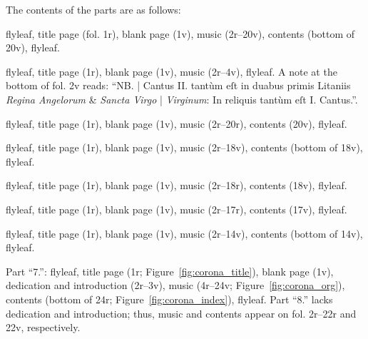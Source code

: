 \documentclass[abbrwidth=7em,shorttitlesize=55]{ees}
\begin{document}
The contents of the parts are as follows:

\begin{description}[labelwidth=1.5em,leftmargin=2em]
  \item[S 1] flyleaf, title page (fol. 1r), blank page (1v), music (2r–20v), contents (bottom of 20v), flyleaf.
  \item[S 2] flyleaf, title page (1r), blank page (1v), music (2r–4v), flyleaf. A note at the bottom of fol. 2v reads: “NB. | Cantus II. tantùm eſt in duabus primis Litaniis \textit{Regina Angelorum} \& \textit{Sancta Virgo} | \textit{Virginum}: In reliquis tantùm eſt I. Cantus.”.
  \item[A] flyleaf, title page (1r), blank page (1v), music (2r–20r), contents (20v), flyleaf.
  \item[T] flyleaf, title page (1r), blank page (1v), music (2r–18v), contents (bottom of 18v), flyleaf.
  \item[B] flyleaf, title page (1r), blank page (1v), music (2r–18r), contents (18v), flyleaf.
  \item[vl 1] flyleaf, title page (1r), blank page (1v), music (2r–17r), contents (17v), flyleaf.
  \item[vl 2] flyleaf, title page (1r), blank page (1v), music (2r–14v), contents (bottom of 14v), flyleaf.
  \item[org] Part “7.”: flyleaf, title page (1r; Figure~\ref{fig:corona_title}), blank page (1v), dedication and introduction (2r–3v), music (4r–24v; Figure~\ref{fig:corona_org}), contents (bottom of 24r; Figure~\ref{fig:corona_index}), flyleaf. Part “8.” lacks dedication and introduction; thus, music and contents appear on fol. 2r–22r and 22v, respectively.
\end{description}
\end{document}
